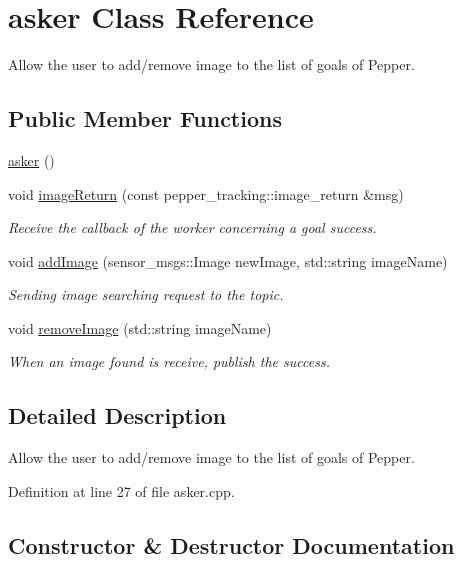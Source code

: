 \hypertarget{classasker}{}\section{asker Class Reference}
\label{classasker}


Allow the user to add/remove image to the list of goals of Pepper.  


\subsection*{Public Member Functions}
\begin{DoxyCompactItemize}
\item 
\hyperlink{classasker_a38f92b2656bc29658461ba95c846e63a}{asker} ()
\item 
void \hyperlink{classasker_a8f975187b555b7f6d47fbf4d31788d9b}{image\+Return} (const pepper\+\_\+tracking\+::image\+\_\+return \&msg)
\begin{DoxyCompactList}\small\item\em Receive the callback of the worker concerning a goal success. \end{DoxyCompactList}\item 
void \hyperlink{classasker_a4c549520b5964424716f28f1753517ad}{add\+Image} (sensor\+\_\+msgs\+::\+Image new\+Image, std\+::string image\+Name)
\begin{DoxyCompactList}\small\item\em Sending image searching request to the topic. \end{DoxyCompactList}\item 
void \hyperlink{classasker_acb07a6a00d25ae3df55ae18583ebfdb3}{remove\+Image} (std\+::string image\+Name)
\begin{DoxyCompactList}\small\item\em When an image found is receive, publish the success. \end{DoxyCompactList}\end{DoxyCompactItemize}


\subsection{Detailed Description}
Allow the user to add/remove image to the list of goals of Pepper. 

Definition at line 27 of file asker.\+cpp.



\subsection{Constructor \& Destructor Documentation}
